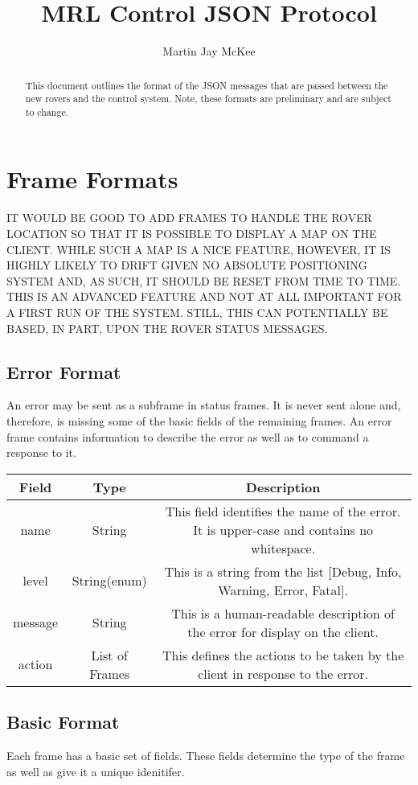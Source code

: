 \documentclass[letterpaper,10pt]{article}
\title{MRL Control JSON Protocol}
\author{Martin Jay McKee}
\date{}
\begin{document}
\maketitle

\begin{abstract}
This document outlines the format of the JSON messages that are passed between the new rovers and the control system.  Note, these formats are preliminary and are subject to change.
\end{abstract}

\section{Frame Formats}
  IT WOULD BE GOOD TO ADD FRAMES TO HANDLE THE ROVER LOCATION SO THAT IT IS POSSIBLE TO DISPLAY A MAP ON THE CLIENT.  WHILE SUCH A MAP IS A NICE FEATURE, HOWEVER, IT IS HIGHLY LIKELY TO DRIFT GIVEN NO ABSOLUTE POSITIONING SYSTEM AND, AS SUCH, IT SHOULD BE RESET FROM TIME TO TIME.  THIS IS AN ADVANCED FEATURE AND NOT AT ALL IMPORTANT FOR A FIRST RUN OF THE SYSTEM.  STILL, THIS CAN POTENTIALLY BE BASED, IN PART, UPON THE ROVER STATUS MESSAGES.
  
  \subsection{Error Format}
    An error may be sent as a subframe in status frames.  It is never sent alone and, therefore, is missing some of the basic fields of the remaining frames.  An error frame contains information to describe the error as well as to command a response to it.
    
    \begin{tabular}{ccc}
      \textbf{Field} & \textbf{Type} & \textbf{Description}\\\hline
      name & String & This field identifies the name of the error.  It is upper-case and contains no whitespace.\\
      level & String(enum) & This is a string from the list [Debug, Info, Warning, Error, Fatal].\\
      message & String & This is a human-readable description of the error for display on the client.\\
      action & List of Frames & This defines the actions to be taken by the client in response to the error.\\
    \end{tabular}
    
  \subsection{Basic Format}
    Each frame has a basic set of fields.  These fields determine the type of the frame as well as give it a unique idenitifer.
      
\end{document}
